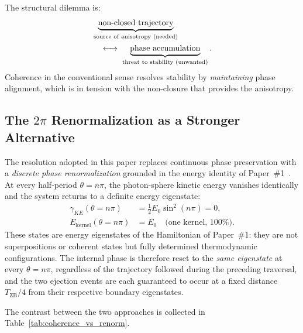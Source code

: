 \documentclass[%
 reprint, amsmath,amssymb, aps, prb, ]{revtex4-2}
\numberwithin{equation}{section}
\newcommand{\iphase}{\theta}
\begin{document}
The structural dilemma is:
\begin{align}
&\underbrace{\text{non-closed trajectory}}_{\text{source of anisotropy (needed)}}
\notag\\
&\quad\longleftrightarrow\;
\underbrace{\text{phase accumulation}}_{\text{threat to stability (unwanted)}}.
\label{eq:dilemma}
\end{align}
Coherence in the conventional sense resolves stability by \emph{maintaining} phase alignment, which is in tension with the non-closure that provides the anisotropy.

\subsection{The $2\pi$ Renormalization as a Stronger Alternative}

The resolution adopted in this paper replaces continuous phase preservation with a \emph{discrete phase renormalization} grounded in the energy identity of Paper~\#1~\cite{hanamura01}.
At every half-period $\iphase = n\pi$, the photon-sphere kinetic energy vanishes identically and the system returns to a definite energy eigenstate:
\begin{align}
\gamma_{KE}(\iphase = n\pi) &= \tfrac{1}{2}E_0\sin^2(n\pi) = 0, \label{eq:KE_zero}\\
E_\mathrm{kernel}(\iphase = n\pi) &= E_0 \quad \text{(one kernel, 100\%).} \label{eq:PE_full}
\end{align}
These states are energy eigenstates of the Hamiltonian of Paper~\#1: they are not superpositions or coherent states but fully determined thermodynamic configurations.
The internal phase is therefore reset to the \emph{same eigenstate} at every $\iphase = n\pi$, regardless of the trajectory followed during the preceding traversal, and the two ejection events are each guaranteed to occur at a fixed distance $T_\mathrm{ZB}/4$ from their respective boundary eigenstates.

The contrast between the two approaches is collected in Table~\ref{tab:coherence_vs_renorm}.
\end{document}
